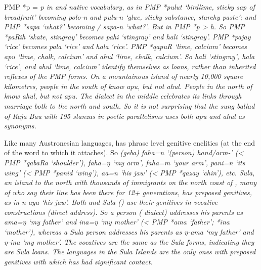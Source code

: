 PMP *p = \it{p} in 
and  native vocabulary,
as in PMP *pulut ‘birdlime,
sticky sap of breadfruit’ becoming  \it{polo-n}
and  \it{pulu-n} ‘glue,
sticky substance, starchy paste’;
and PMP *sapa ‘what?’ becoming / \it{sapa-n} ‘what?’.
But in  PMP *p > \it{h}.
So PMP *paRih ‘skate,
stingray’ becomes  \it{pahi} ‘stingray’
and  \it{hali} ‘stingray’.
PMP *pajay ‘rice’ becomes  \it{pala} ‘rice’
and  \it{hala} ‘rice’.
PMP *qapuR ‘lime, calcium’ becomes  \it{apu} ‘lime,
chalk, calcium’ and  \it{ahul} ‘lime, chalk, calcium’.
So  \it{hali} ‘stingray’,
\it{hala} ‘rice’, and \it{ahul} ‘lime, calcium’ identify themselves
as  loans, rather than inherited reflexes of the PMP forms.
On a mountainous island of nearly 10,000 square kilometres,
people in the south of  know \it{apu}, but not \it{ahul}.
People in the north of  know \it{ahul}, but not \it{apu}.
The  dialect in the middle celebrates its links through marriage
both to the north and south.
So it is not surprising that the sung ballad of Raja Bau with
195 stanzas in poetic parallelisms uses both \it{apu}
and \it{ahul} as synonyms.

Like many Austronesian languages,
 has phrase level genitive enclitics
(at the end of the word
to which it attaches).
So \it{(geba) faha=n} ‘(person) hand/arm-’ (< PMP
*qabaRa ‘shoulder’), \it{faha=ŋ} ‘my arm’, \it{faha=m} ‘your arm’,
\it{pani=n} ‘its wing’ (< PMP *panid ‘wing’),
\it{aa=n} ‘his jaw’ (< PMP *qazay ‘chin’), etc.
Sula, an island to the north with thousands of immigrants on
the north coast of ,
many of who say their line has been there for 12+ generations,
has preposed genitives, as in \it{n-aya} ‘his jaw’.
Both  and Sula () use their genitives
in vocative constructions (direct address).
So a  person ( dialect) addresses his parents as \it{ama=ŋ}
‘my father’ and \it{ina=ŋ} ‘my mother’ (< PMP *ama ‘father’; *ina ‘mother’),
whereas a Sula person addresses his parents as \it{ŋ-ama} ‘my
father’ and \it{ŋ-ina} ‘my mother’.
The  vocatives are the same as the Sula forms,
indicating they are Sula loans.
The languages in the Sula Islands are the only ones with preposed
genitives with which  has had significant contact.

